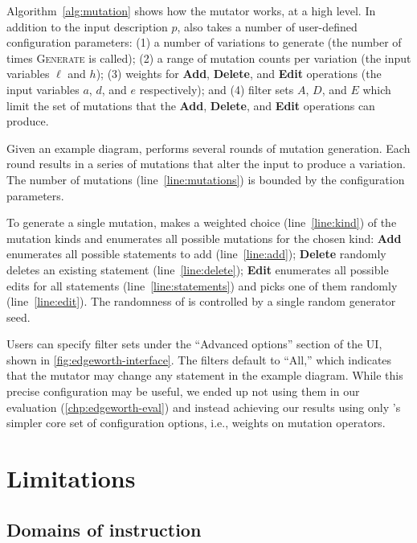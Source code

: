 Algorithm~\ref{alg:mutation} shows how the \Edgeworth mutator works, at a high level. In addition to the input \Substance description $p$, \Edgeworth also takes a number of user-defined configuration parameters: (1) a number of variations to generate (the number of times \textsc{Generate} is called); (2) a range of mutation counts per variation (the input variables $\ell$ and $h$); (3) weights for \textbf{Add}, \textbf{Delete}, and \textbf{Edit} operations (the input variables $a$, $d$, and $e$ respectively); and (4) filter sets $A$, $D$, and $E$ which limit the set of mutations that the \textbf{Add}, \textbf{Delete}, and \textbf{Edit} operations can produce.

Given an example diagram, \Edgeworth performs several rounds of mutation generation. Each round results in a series of mutations that alter the input to produce a variation. The number of mutations (line~\ref{line:mutations}) is bounded by the configuration parameters.

To generate a single mutation, \Edgeworth makes a weighted choice (line~\ref{line:kind}) of the mutation kinds and enumerates all possible mutations for the chosen kind: \textbf{Add} enumerates all possible statements to add (line~\ref{line:add}); \textbf{Delete} randomly deletes an existing statement (line~\ref{line:delete}); \textbf{Edit} enumerates all possible edits for all statements (line~\ref{line:statements}) and picks one of them randomly (line~\ref{line:edit}). The randomness of \Edgeworth is controlled by a single random generator seed.

Users can specify filter sets under the ``Advanced options'' section of the UI, shown in \cref{fig:edgeworth-interface}. The filters default to ``All,'' which indicates that the mutator may change any statement in the example diagram. While this precise configuration may be useful, we ended up not using them in our evaluation (\cref{chp:edgeworth-eval}) and instead achieving our results using only \Edgeworth's simpler core set of configuration options, i.e., weights on mutation operators.

\section{Limitations}
\label{sec:limitations}

\subsection{Domains of instruction}
\label{sec:extension}


